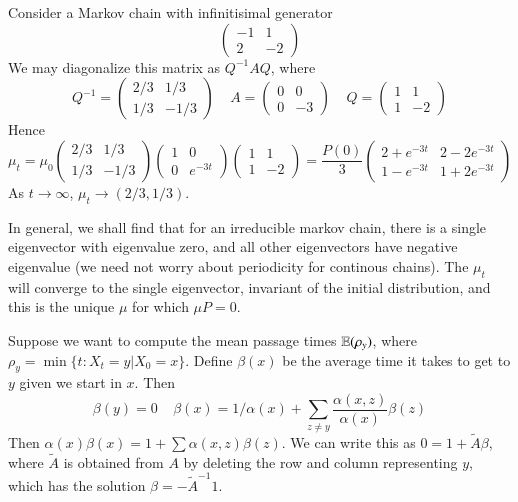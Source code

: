 \begin{example}
    Consider a Markov chain with infinitisimal generator
    \[ \begin{pmatrix} -1 & 1 \\ 2 & -2 \end{pmatrix} \]
    We may diagonalize this matrix as $Q^{-1}AQ$, where
    \[ Q^{-1} = \begin{pmatrix} 2/3 & 1/3 \\ 1/3 & -1/3 \end{pmatrix}\ \ \ \ \ A = \begin{pmatrix} 0 & 0 \\ 0 & -3 \end{pmatrix}\ \ \ \ \ Q = \begin{pmatrix} 1 & 1 \\ 1 & -2 \end{pmatrix} \]
    Hence
    \[ \mu_t = \mu_0 \begin{pmatrix} 2/3 & 1/3 \\ 1/3 & -1/3 \end{pmatrix} \begin{pmatrix} 1 & 0 \\ 0 & e^{-3t} \end{pmatrix} \begin{pmatrix} 1 & 1 \\ 1 & -2 \end{pmatrix} = \frac{P(0)}{3} \begin{pmatrix} 2 + e^{-3t} & 2 - 2e^{-3t} \\ 1 - e^{-3t} & 1 + 2e^{-3t} \end{pmatrix} \]
    As $t \to \infty$, $\mu_t \to (2/3, 1/3)$.
\end{example}

In general, we shall find that for an irreducible markov chain, there is a single eigenvector with eigenvalue zero, and all other eigenvectors have negative eigenvalue (we need not worry about periodicity for continous chains). The $\mu_t$ will converge to the single eigenvector, invariant of the initial distribution, and this is the unique $\mu$ for which $\mu P = 0$.

Suppose we want to compute the mean passage times $\operatorname{\mathbb{E}}(\rho_y)$, where $\rho_y = \min \{ t : X_t = y | X_0 = x \}$. Define $\beta(x)$ be the average time it takes to get to $y$ given we start in $x$. Then
%
\[ \beta(y) = 0\ \ \ \ \ \beta(x) = 1/\alpha(x) + \sum_{z \neq y} \frac{\alpha(x,z)}{\alpha(x)} \beta(z) \]
%
Then $\alpha(x) \beta(x) = 1 + \sum \alpha(x,z) \beta(z)$. We can write this as $0 = 1 + \tilde{A} \beta$, where $\tilde{A}$ is obtained from $A$ by deleting the row and column representing $y$, which has the solution $\beta = -\tilde{A}^{-1} 1$.

